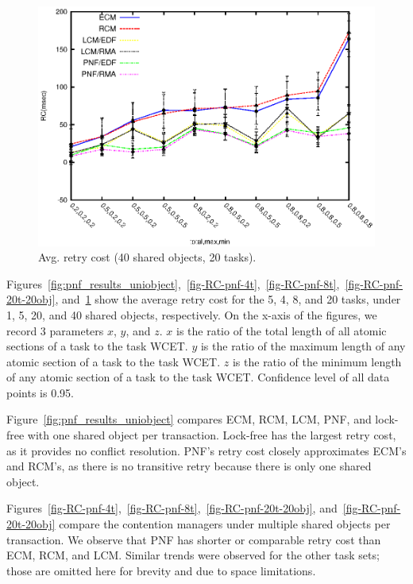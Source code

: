 \documentclass[twocolumn]{article}
\begin{document}
\begin{figure}[h]
\centering
\includegraphics[scale=0.7]{figures/Abr_dur_20t_420obj_100wr}
\caption{Avg. retry cost (40 shared objects, 20 tasks).}
\label{fig-RC-pnf-20t-40obj}
\end{figure}

Figures~\ref{fig:pnf_results_uniobject},~\ref{fig-RC-pnf-4t},~\ref{fig-RC-pnf-8t},~\ref{fig-RC-pnf-20t-20obj}, and~\ref{fig-RC-pnf-20t-40obj} show the average retry cost for the 5, 4, 8, and 20 tasks, under 1, 5, 20, and 40 shared objects, respectively. On the x-axis of the figures, we record 3 parameters $x$, $y$, and $z$. $x$ is the ratio of the total length of all atomic sections of a task to the task WCET. $y$ is the ratio of the maximum length of any atomic section of a task to the task WCET. $z$ is the ratio of the minimum length of any atomic section of a task to the task WCET. Confidence level of all data points is 0.95. 

Figure~\ref{fig:pnf_results_uniobject} compares ECM, RCM, LCM, PNF, and lock-free with one shared object per transaction. Lock-free has the largest retry cost, as it provides no conflict resolution. PNF's retry cost closely approximates ECM's and RCM's, as there is no transitive retry because there is only one shared object. 

Figures~\ref{fig-RC-pnf-4t},~\ref{fig-RC-pnf-8t},~\ref{fig-RC-pnf-20t-20obj}, and~\ref{fig-RC-pnf-20t-20obj} compare the contention managers under multiple shared objects per transaction. We observe that PNF has shorter or comparable retry cost than ECM, RCM, and LCM. Similar trends were observed for the other task sets; those are omitted here for brevity and due to space limitations.
\end{document}
